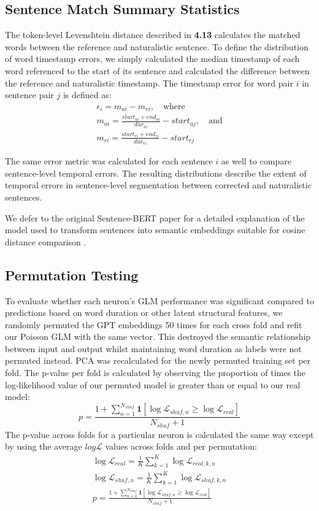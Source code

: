\documentclass[pdflatex,sn-basic]{sn-jnl}%
\theoremstyle{thmstyleone}%
\theoremstyle{thmstyletwo}%
\theoremstyle{thmstylethree}%
\begin{document}
\subsection{Sentence Match Summary Statistics}\label{subsec14}
The token-level Levenshtein distance described in \textbf{4.13} calculates the matched words between the reference and naturalistic sentence. To define the distribution of word timestamp errors, we simply calculated the median timestamp of each word referenced to the start of its sentence and calculated the difference between the reference and naturalistic timestamp. The timestamp error for word pair $i$ in sentence pair $j$ is defined as:
\begin{gather*}
\epsilon_i=m_{ai}-m_{ri},\quad\text{where}\\
m_{ai}=\frac{start_{ai}+end_{ai}}{dur_{ai}}-start_{aj},\quad\text{and}\\
m_{ri}=\frac{start_{ri}+end_{ri}}{dur_{ri}}-start_{rj}
\end{gather*}

The same error metric was calculated for each sentence $i$ as well to compare sentence-level temporal errors. The resulting distributions describe the extent of temporal errors in sentence-level segmentation between corrected and naturalistic sentences.

We defer to the original Sentence-BERT paper for a detailed explanation of the model used to transform sentences into semantic embeddings suitable for cosine distance comparison \citep{bib54}.

\subsection{Permutation Testing}\label{subsec15}

To evaluate whether each neuron’s GLM performance was significant compared to predictions based on word duration or other latent structural features, we randomly permuted the GPT embeddings 50 times for each cross fold and refit our Poisson GLM with the same vector. This destroyed the semantic relationship between input and output whilst maintaining word duration as labels were not permuted instead. PCA was recalculated for the newly permuted training set per fold. The p-value per fold is calculated by observing the proportion of times the log-likelihood value of our permuted model is greater than or equal to our real model:
\[
p=\frac{1+\sum_{n=1}^{N_\mathit{shuf}}\mathbf{1}[\log\mathcal{L}_{\mathit{shuf},n}\ge\log\mathcal{L}_\mathit{real}]}{N_\mathit{shuf}+1}
\]
The p-value across folds for a particular neuron is calculated the same way except by using the average $log\mathcal{L}$  values across folds and per permutation:
\begin{gather*}
\log\mathcal{L}_\mathit{real}=\frac{1}{K}\sum_{k=1}^K\log\mathcal{L}_{\mathit{real},k,n}\\
\log\mathcal{L}_{\mathit{shuf},n}=\frac{1}{K}\sum_{k=1}^K\log\mathcal{L}_{\mathit{shuf},k,n}\\
p=\frac{1+\sum_{n=1}^{N_\mathit{shuf}}\mathbf{1}[\log\mathcal{L}_{\mathit{shuf},n}\ge\log\mathcal{L}_\mathit{real}]}{N_\mathit{shuf}+1}
\end{gather*}
\end{document}
